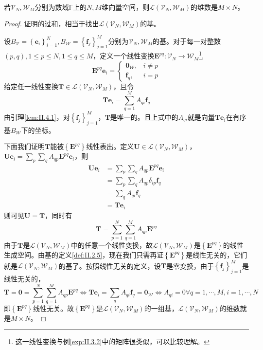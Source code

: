 \documentclass[main.tex]{subfiles}
\begin{document}
\begin{theorem}\label{thm:II.4.2}
若$\mathcal{V}_N,\mathcal{W}_M$分别为数域$\mathbb{F}$上的$N,M$维向量空间，则$\mathcal{L}\left(\mathcal{V}_N,\mathcal{W}_M\right)$的维数是$M\times N$。
\end{theorem}
\begin{proof}
证明的过和，相当于找出$\mathcal{L}\left(\mathcal{V}_N,\mathcal{W}_M\right)$的基。

设$B_\mathcal{V}=\left\{\mathbf{e}_i\right\}_{i=1}^N,B_\mathcal{W}=\left\{\mathbf{f}_j\right\}_{j=1}^M$分别为$\mathcal{V}_N,\mathcal{W}_M$的基。对于每一对整数$\left(p,q\right),1\leq p\leq N,1\leq q\leq M$，定义一个线性变换$\mathbf{E}^{pq}:\mathcal{V}_N\rightarrow\mathcal{W}_M$\footnote{这一线性变换与例\ref{exp:II.3.2}中的矩阵很类似，可以比较理解。},
\[
\mathbf{E}^{pq}\mathbf{e}_i=\left\{\begin{array}{cc}
    \mathbf{0}_\mathcal{W},&i\neq p  \\
     \mathbf{f}_q,&i=p 
\end{array}\right.
\]
给定任一线性变换$\mathbf{T}\in\mathcal{L}\left(\mathcal{V}_N,\mathcal{W}_M\right)$，且令
\[\mathbf{Te}_i=\sum_{q=1}^MA_{qi}\mathbf{f}_q\]
由引理\ref{lem:II.4.1}，对$\left\{\mathbf{f}_j\right\}_{j=1}^M$，$\mathbf{T}$是唯一的。且上式中的$A_{qi}$就是向量$\mathbf{Te}_i$在有序基$B_\mathcal{W}$下的坐标。

下面我们证明$\mathbf{T}$能被$\left\{\mathbf{E}^{pq}\right\}$线性表出。定义$\mathbf{U}\in\mathcal{L}\left(\mathcal{V}_N,\mathcal{W}_M\right)$，$\mathbf{Ue}_i=\sum_p\sum_qA_{qp}\mathbf{E}^{pq}\mathbf{e}_i$，则
\begin{align*}
    \mathbf{Ue}_i&=\sum_p\sum_qA_{qp}\mathbf{E}^{pq}\mathbf{e}_i\\
    &=\sum_p\sum_qA_{qp}\delta_{ip}\mathbf{f}_q\\
    &=\sum_qA_{qi}\mathbf{f}_q\\
    &=\mathbf{Te}_i
\end{align*}
则可见$\mathbf{U}=\mathbf{T}$，同时有
\[\mathbf{T}=\sum_{p=1}^N\sum_{q=1}^MA_{qp}\mathbf{E}^{pq}\]
由于$\mathbf{T}$是$\mathcal{L}\left(\mathcal{V}_N,\mathcal{W}_M\right)$中的任意一个线性变换，故$\mathcal{L}\left(\mathcal{V}_N,\mathcal{W}_M\right)$是$\left\{\mathbf{E}^{pq}\right\}$的线性生成空间。由基的定义\ref{def:II.2.5}，现在我们只需再证$\left\{\mathbf{E}^{pq}\right\}$是线性无关的，它们就是$\mathcal{L}\left(\mathcal{V}_N,\mathcal{W}_M\right)$的基了。按照线性无关的定义，设$\mathbf{T}$是零变换，由于$\left\{\mathbf{f}_j\right\}_{j=1}^M$是线性无关的，
\[\mathbf{T}=\mathbf{0}=\sum_{p=1}^N\sum_{q=1}^MA_{qp}\mathbf{E}^{pq}\Leftrightarrow\mathbf{Te}_i=\sum_q A_{qi}\mathbf{f}_q=\mathbf{0}_\mathcal{W}\Leftrightarrow A_{qi}=0\forall q=1,\cdots,M,i=1,\cdots,N\]
即$\left\{\mathbf{E}^{pq}\right\}$线性无关。故$\left\{\mathbf{E}^{pq}\right\}$是$\mathcal{L}\left(\mathcal{V}_N,\mathcal{W}_M\right)$的一组基，$\mathcal{L}\left(\mathcal{V}_N,\mathcal{W}_M\right)$的维数就是$M\times N$。
\end{proof}
\end{document}
